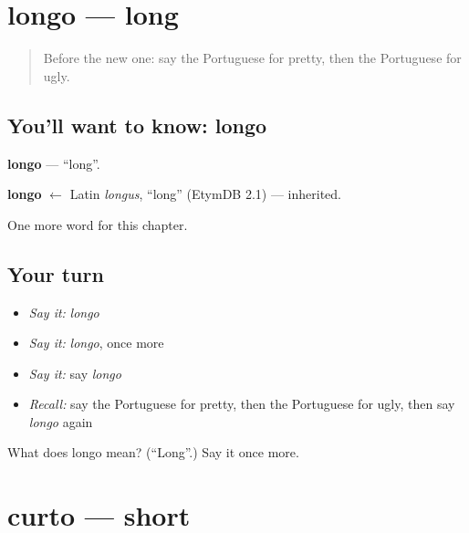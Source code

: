 \section[longo]{longo — long}

\label{lesson:PT-C65-longo}



\begin{quote}
Before the new one: say the Portuguese for pretty, then the Portuguese for ugly.
\end{quote}

\subsection*{You'll want to know: longo}
\textbf{longo} — \textquotedblleft{}long\textquotedblright{}.

\begin{cousinweb}
\textbf{longo} $\leftarrow$ Latin \emph{longus}, \textquotedblleft{}long\textquotedblright{} (EtymDB 2.1) — inherited.
\end{cousinweb}

\begin{grammarlens}[title={What you've built}]
One more word for this chapter.
\end{grammarlens}

\subsection*{Your turn}
\begin{itemize}
\raggedright
  \item \emph{Say it:} \emph{longo}
  \item \emph{Say it:} \emph{longo}, once more
  \item \emph{Say it:} say \emph{longo}
  \item \emph{Recall:} say the Portuguese for pretty, then the Portuguese for ugly, then say \emph{longo} again
\end{itemize}

\begin{tcolorbox}[breakable,colback=teal!4,colframe=teal!35!black,title={Before you move on}]
What does longo mean? (\textquotedblleft{}Long\textquotedblright{}.) Say it once more.
\end{tcolorbox}
\section[curto]{curto — short}

